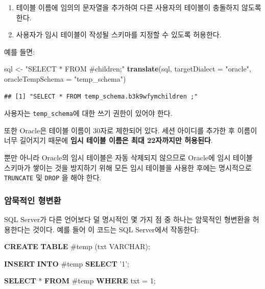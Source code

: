 \documentclass[11pt]{book}
\newenvironment{Shaded}{\begin{snugshade}}{\end{snugshade}}
\newcommand{\KeywordTok}[1]{\textcolor[rgb]{0.13,0.29,0.53}{\textbf{#1}}}
\newcommand{\DataTypeTok}[1]{\textcolor[rgb]{0.13,0.29,0.53}{#1}}
\newcommand{\DecValTok}[1]{\textcolor[rgb]{0.00,0.00,0.81}{#1}}
\newcommand{\StringTok}[1]{\textcolor[rgb]{0.31,0.60,0.02}{#1}}
\newcommand{\NormalTok}[1]{#1}
\providecommand{\tightlist}{%
  \setlength{\itemsep}{0pt}\setlength{\parskip}{0pt}}
\theoremstyle{definition}
\theoremstyle{definition}
\theoremstyle{definition}
\theoremstyle{remark}
\begin{document}
\begin{enumerate}
\def\labelenumi{\arabic{enumi}.}
\tightlist
\item
  테이블 이름에 임의의 문자열을 추가하여 다른 사용자의 테이블이 충돌하지
  않도록 한다.
\item
  사용자가 임시 테이블이 작성될 스키마를 지정할 수 있도록 허용한다.
\end{enumerate}

예를 들면:

\begin{Shaded}
\begin{Highlighting}[]
\NormalTok{sql <-}\StringTok{ "SELECT * FROM #children;"}
\KeywordTok{translate}\NormalTok{(sql, }\DataTypeTok{targetDialect =} \StringTok{"oracle"}\NormalTok{, }\DataTypeTok{oracleTempSchema =} \StringTok{"temp_schema"}\NormalTok{)}
\end{Highlighting}
\end{Shaded}

\begin{verbatim}
## [1] "SELECT * FROM temp_schema.b3k9wfymchildren ;"
\end{verbatim}

사용자는 \texttt{temp\_schema}에 대한 쓰기 권한이 있어야 한다.

또한 Oracle은 테이블 이름이 30자로 제한되어 있다. 세션 아이디를 추가한
후 이름이 너무 길어지기 때문에 \textbf{임시 테이블 이름은 최대
22자까지만 허용된다}.

뿐만 아니라 Oracle의 임시 테이블은 자동 삭제되지 않으므로 Oracle에 임시
테이블 스키마가 쌓이는 것을 방지하기 위해 모든 임시 테이블을 사용한
후에는 명시적으로 \texttt{TRUNCATE} 및 \texttt{DROP} 을 해야 한다.

\subsubsection*{암묵적인 형변환}\label{-}

SQL Server가 다른 언어보다 덜 명시적인 몇 가지 점 중 하나는 암묵적인
형변환을 허용한다는 것이다. 예를 들어 이 코드는 SQL Server에서 작동한다:

\begin{Shaded}
\begin{Highlighting}[]
\KeywordTok{CREATE} \KeywordTok{TABLE}\NormalTok{ #temp (txt }\DataTypeTok{VARCHAR}\NormalTok{);}

\KeywordTok{INSERT} \KeywordTok{INTO}\NormalTok{ #temp}
\KeywordTok{SELECT} \StringTok{'1'}\NormalTok{;}

\KeywordTok{SELECT}\NormalTok{ * }\KeywordTok{FROM}\NormalTok{ #temp }\KeywordTok{WHERE}\NormalTok{ txt = }\DecValTok{1}\NormalTok{;}
\end{Highlighting}
\end{Shaded}
\end{document}
